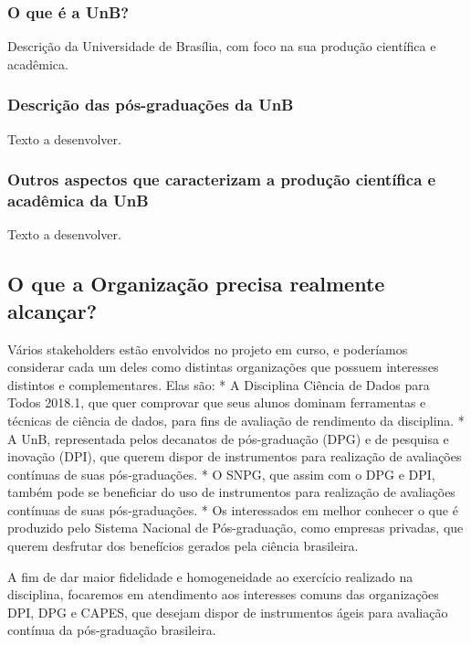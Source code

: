 \documentclass[]{article}
\begin{document}
\subsubsection{O que é a UnB?}\label{o-que-e-a-unb}

Descrição da Universidade de Brasília, com foco na sua produção
científica e acadêmica.

\subsubsection{Descrição das pós-graduações da
UnB}\label{descricao-das-pos-graduacoes-da-unb}

Texto a desenvolver.

\subsubsection{Outros aspectos que caracterizam a produção científica e
acadêmica da
UnB}\label{outros-aspectos-que-caracterizam-a-producao-cientifica-e-academica-da-unb}

Texto a desenvolver.

\subsection{O que a Organização precisa realmente
alcançar?}\label{o-que-a-organizacao-precisa-realmente-alcancar}

Vários stakeholders estão envolvidos no projeto em curso, e poderíamos
considerar cada um deles como distintas organizações que possuem
interesses distintos e complementares. Elas são: * A Disciplina Ciência
de Dados para Todos 2018.1, que quer comprovar que seus alunos dominam
ferramentas e técnicas de ciência de dados, para fins de avaliação de
rendimento da disciplina. * A UnB, representada pelos decanatos de
pós-graduação (DPG) e de pesquisa e inovação (DPI), que querem dispor de
instrumentos para realização de avaliações contínuas de suas
pós-graduações. * O SNPG, que assim com o DPG e DPI, também pode se
beneficiar do uso de instrumentos para realização de avaliações
contínuas de suas pós-graduações. * Os interessados em melhor conhecer o
que é produzido pelo Sistema Nacional de Pós-graduação, como empresas
privadas, que querem desfrutar dos benefícios gerados pela ciência
brasileira.

A fim de dar maior fidelidade e homogeneidade ao exercício realizado na
disciplina, focaremos em atendimento aos interesses comuns das
organizações DPI, DPG e CAPES, que desejam dispor de instrumentos ágeis
para avaliação contínua da pós-graduação brasileira.
\end{document}
